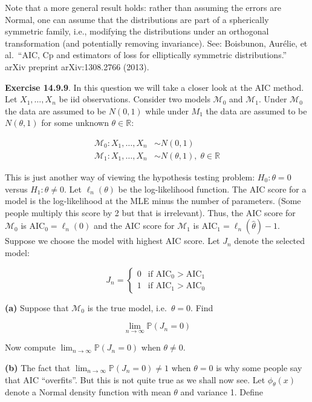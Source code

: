 Note that a more general result holds: rather than assuming the errors
are Normal, one can assume that the distributions are part of a
spherically symmetric family, i.e., modifying the distributions under an
orthogonal transformation (and potentially removing invariance). See:
Boisbunon, Aurélie, et al.~``AIC, Cp and estimators of loss for
elliptically symmetric distributions.'' arXiv preprint arXiv:1308.2766
(2013).

\textbf{Exercise 14.9.9}. In this question we will take a closer look at the AIC method. Let \(X_{1}, \dots, X_{n}\) be iid observations. Consider two models \(\mathcal{M}_{0}\) and \(\mathcal{M}_{1}\). Under \(\mathcal{M}_{0}\) the data are assumed to be \(N(0, 1)\) while under \(M_{1}\) the data are assumed to be \(N(\theta, 1)\) for some unknown \(\theta \in \mathbb{R}\):

\begin{align*}
\mathcal{M}_{0} : X_{1}, \dots, X_{n} &\sim N(0, 1) \\
\mathcal{M}_{1} : X_{1}, \dots, X_{n} &\sim N(\theta, 1), \; \theta \in \mathbb{R}
\end{align*}

This is just another way of viewing the hypothesis testing problem: \(H_{0}: \theta = 0\) versus \(H_{1}: \theta \neq 0\). Let \(\ell_{n}(\theta)\) be the log-likelihood function. The AIC score for a model is the log-likelihood at the MLE minus the number of parameters. (Some people multiply this score by 2 but that is irrelevant). Thus, the AIC score for \(\mathcal{M}_{0}\) is \(\text{AIC}_{0} = \ell_{n}(0)\) and the AIC score for \(\mathcal{M}_{1}\) is \(\text{AIC}_{1} = \ell_{n}(\hat{\theta}) - 1\). Suppose we choose the model with highest AIC score. Let \(J_{n}\) denote the selected model:

\[
J_{n} = 
\begin{cases}
0 & \text{if } \text{AIC}_{0} > \text{AIC}_{1} \\
1 & \text{if } \text{AIC}_{1} > \text{AIC}_{0}
\end{cases}
\]

\textbf{(a)} Suppose that \(\mathcal{M}_{0}\) is the true model, i.e.~\(\theta = 0\). Find

\[ \lim_{n \rightarrow \infty} \mathbb{P}(J_{n} = 0) \]

Now compute \(\lim_{n \rightarrow \infty} \mathbb{P}(J_{n} = 0)\) when \(\theta \neq 0\).

\textbf{(b)} The fact that \(\lim_{n \rightarrow \infty} \mathbb{P}(J_{n} = 0) \neq 1\) when \(\theta = 0\) is why some people say that AIC ``overfits''. But this is not quite true as we shall now see. Let \(\phi_\theta(x)\) denote a Normal density function with mean \(\theta\) and variance 1. Define

